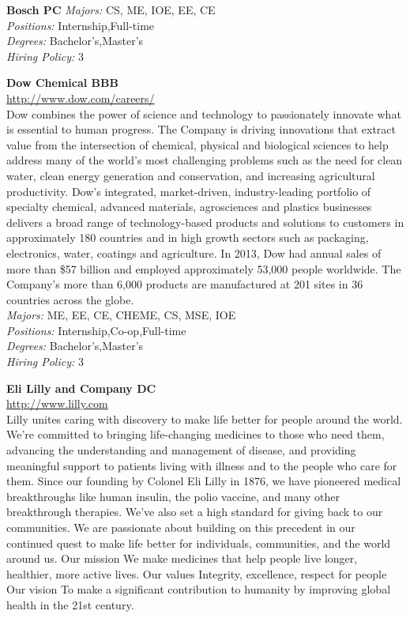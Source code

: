 \documentclass[twoside]{article}
\begin{document}
\begin{center}
\begin{multicols}{2}
\begin{minipage}{.95\columnwidth}{\Large\bf Bosch \hfill PC}
    \emph{Majors:} CS, ME, IOE, EE, CE\\
    \emph{Positions:} Internship,Full-time\\
    \emph{Degrees:} Bachelor's,Master's\\
    \emph{Hiring Policy:} 3\\
\end{minipage}
 \begin{minipage}{.95\columnwidth}{\Large\bf Dow Chemical \hfill BBB}\\
    \url{http://www.dow.com/careers/}\\
    Dow combines the power of science and technology to passionately innovate what is essential to human progress. The Company is driving innovations that extract value from the intersection of chemical, physical and biological sciences to help address many of the world's most challenging problems such as the need for clean water, clean energy generation and conservation, and increasing agricultural productivity. Dow's integrated, market-driven, industry-leading portfolio of specialty chemical, advanced materials, agrosciences and plastics businesses delivers a broad range of technology-based products and solutions to customers in approximately 180 countries and in high growth sectors such as packaging, electronics, water, coatings and agriculture. In 2013, Dow had annual sales of more than \$57 billion and employed approximately 53,000 people worldwide. The Company's more than 6,000 products are manufactured at 201 sites in 36 countries across the globe.\\
    \emph{Majors:} ME, EE, CE, CHEME, CS, MSE, IOE\\
    \emph{Positions:} Internship,Co-op,Full-time\\
    \emph{Degrees:} Bachelor's,Master's\\
    \emph{Hiring Policy:} 3\\
\end{minipage}
 \begin{minipage}{.95\columnwidth}{\Large\bf Eli Lilly and Company \hfill DC}\\
    \url{http://www.lilly.com}\\
    Lilly unites caring with discovery to make life better for people around the world. We’re committed to bringing life-changing medicines to those who need them, advancing the understanding and management of disease, and providing meaningful support to patients living with illness and to the people who care for them. Since our founding by Colonel Eli Lilly in 1876, we have pioneered medical breakthroughs like human insulin, the polio vaccine, and many other breakthrough therapies. We’ve also set a high standard for giving back to our communities. We are passionate about building on this precedent in our continued quest to make life better for individuals, communities, and the world around us. Our mission We make medicines that help people live longer, healthier, more active lives. Our values Integrity, excellence, respect for people Our vision To make a significant contribution to humanity by improving global health in the 21st century.\\

\end{minipage}
\end{multicols}
\end{center}
\end{document}
